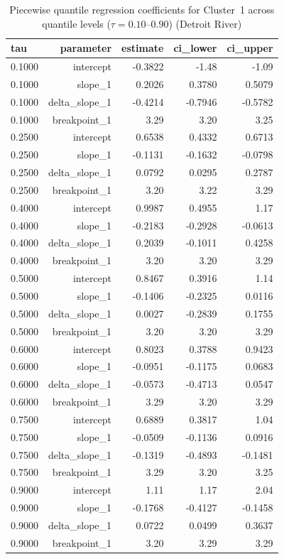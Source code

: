 \begin{table}[htbp]
  \centering
  \caption{Piecewise quantile regression coefficients for Cluster~1 across quantile levels ($\tau = 0.10$--$0.90$) (Detroit River)}
  \label{tab:dr_05_piecewise_qr_qr_coefficients_cluster_1}
  \begin{tabular}{lrrrr}
    \toprule
    tau & parameter & estimate & ci\_lower & ci\_upper \\
    \midrule
    0.1000 & intercept & -0.3822 & -1.48 & -1.09 \\
    0.1000 & slope\_1 & 0.2026 & 0.3780 & 0.5079 \\
    0.1000 & delta\_slope\_1 & -0.4214 & -0.7946 & -0.5782 \\
    0.1000 & breakpoint\_1 & 3.29 & 3.20 & 3.25 \\
    0.2500 & intercept & 0.6538 & 0.4332 & 0.6713 \\
    0.2500 & slope\_1 & -0.1131 & -0.1632 & -0.0798 \\
    0.2500 & delta\_slope\_1 & 0.0792 & 0.0295 & 0.2787 \\
    0.2500 & breakpoint\_1 & 3.20 & 3.22 & 3.29 \\
    0.4000 & intercept & 0.9987 & 0.4955 & 1.17 \\
    0.4000 & slope\_1 & -0.2183 & -0.2928 & -0.0613 \\
    0.4000 & delta\_slope\_1 & 0.2039 & -0.1011 & 0.4258 \\
    0.4000 & breakpoint\_1 & 3.20 & 3.20 & 3.29 \\
    0.5000 & intercept & 0.8467 & 0.3916 & 1.14 \\
    0.5000 & slope\_1 & -0.1406 & -0.2325 & 0.0116 \\
    0.5000 & delta\_slope\_1 & 0.0027 & -0.2839 & 0.1755 \\
    0.5000 & breakpoint\_1 & 3.20 & 3.20 & 3.29 \\
    0.6000 & intercept & 0.8023 & 0.3788 & 0.9423 \\
    0.6000 & slope\_1 & -0.0951 & -0.1175 & 0.0683 \\
    0.6000 & delta\_slope\_1 & -0.0573 & -0.4713 & 0.0547 \\
    0.6000 & breakpoint\_1 & 3.29 & 3.20 & 3.29 \\
    0.7500 & intercept & 0.6889 & 0.3817 & 1.04 \\
    0.7500 & slope\_1 & -0.0509 & -0.1136 & 0.0916 \\
    0.7500 & delta\_slope\_1 & -0.1319 & -0.4893 & -0.1481 \\
    0.7500 & breakpoint\_1 & 3.29 & 3.20 & 3.25 \\
    0.9000 & intercept & 1.11 & 1.17 & 2.04 \\
    0.9000 & slope\_1 & -0.1768 & -0.4127 & -0.1458 \\
    0.9000 & delta\_slope\_1 & 0.0722 & 0.0499 & 0.3637 \\
    0.9000 & breakpoint\_1 & 3.20 & 3.29 & 3.29 \\
    \bottomrule
  \end{tabular}
\end{table}
